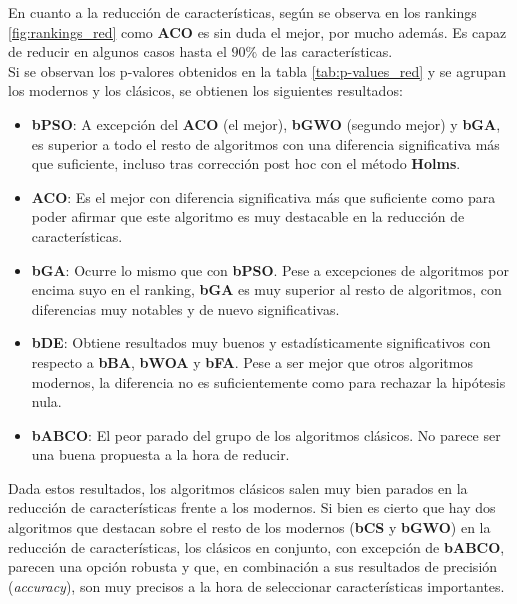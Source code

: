 En cuanto a la reducción de características, según se observa en los rankings \ref{fig:rankings_red} como \textbf{ACO} es sin duda el mejor, por mucho además. Es capaz de reducir en algunos casos hasta el $90\%$ de las características.\\[6pt]
Si se observan los p-valores obtenidos en la tabla \ref{tab:p-values_red} y se agrupan los modernos y los clásicos, se obtienen los siguientes resultados:
\begin{itemize}
    \item \textbf{bPSO}: A excepción del \textbf{ACO} (el mejor), \textbf{bGWO} (segundo mejor) y \textbf{bGA}, es superior a todo el resto de algoritmos con una diferencia significativa más que suficiente, incluso tras corrección post hoc con el método \textbf{Holms}.
    \item \textbf{ACO}: Es el mejor con diferencia significativa más que suficiente como para poder afirmar que este algoritmo es muy destacable en la reducción de características.
    \item \textbf{bGA}: Ocurre lo mismo que con \textbf{bPSO}. Pese a excepciones de algoritmos por encima suyo en el ranking, \textbf{bGA} es muy superior al resto de algoritmos, con diferencias muy notables y de nuevo significativas.
    \item \textbf{bDE}: Obtiene resultados muy buenos y estadísticamente significativos con respecto a \textbf{bBA}, \textbf{bWOA} y \textbf{bFA}. Pese a ser mejor que otros algoritmos modernos, la diferencia no es suficientemente como para rechazar la hipótesis nula.
    \item \textbf{bABCO}: El peor parado del grupo de los algoritmos clásicos. No parece ser una buena propuesta a la hora de reducir.
\end{itemize}

Dada estos resultados, los algoritmos clásicos salen muy bien parados en la reducción de características frente a los modernos. Si bien es cierto que hay dos algoritmos que destacan sobre el resto de los modernos (\textbf{bCS} y \textbf{bGWO}) en la reducción de características, los clásicos en conjunto, con excepción de \textbf{bABCO}, parecen una opción robusta y que, en combinación a sus resultados de precisión (\textit{accuracy}), son muy precisos a la hora de seleccionar características importantes.

